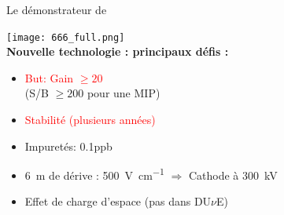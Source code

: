     \begin{frame}{Le démonstrateur de \SSS{}}
    	\begin{scriptsize}
                \centering
    			\texttt{[image: 666\_full.png]}\\
    			\vfill
    			\textbf{Nouvelle technologie : principaux défis :}\\
    			\begin{minipage}{0.32\textwidth}
    				\begin{itemize}
    					\item \textcolor{red}{But: Gain $\geq 20$} \\(S/B $\geq 200$ pour une MIP)
    					\item \textcolor{red}{Stabilité (plusieurs années)}
    				\end{itemize}
    			\end{minipage}\hfill
    			\begin{minipage}{0.32\textwidth}
    				\begin{itemize}
    					\item Impuretés: 0.1\;ppb
    					\item \SI{6}{\meter} de dérive : \SI{500}{\volt\per\centi\meter} $\Rightarrow$ Cathode à \SI{300}{\kilo\volt}
    				\end{itemize}
	    		\end{minipage}\hfill
	    		\begin{minipage}{0.32\textwidth}
	    			\begin{itemize}
    					\item[\danger] Effet de charge d'espace (pas dans DU$\nu$E)
	    			\end{itemize}
	    		\end{minipage}
    	\end{scriptsize} 
    \end{frame}
    

